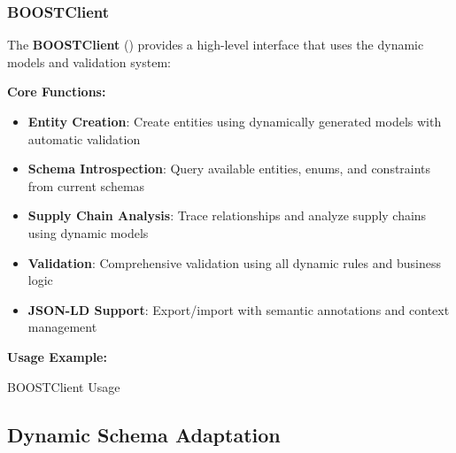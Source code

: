 \subsubsection{BOOSTClient}
\label{sec:python-client}

The \textbf{BOOSTClient} () provides a high-level interface that uses the dynamic models and validation system:

\textbf{Core Functions:}
\begin{itemize}
    \item \textbf{Entity Creation}: Create entities using dynamically generated models with automatic validation
    \item \textbf{Schema Introspection}: Query available entities, enums, and constraints from current schemas
    \item \textbf{Supply Chain Analysis}: Trace relationships and analyze supply chains using dynamic models
    \item \textbf{Validation}: Comprehensive validation using all dynamic rules and business logic
    \item \textbf{JSON-LD Support}: Export/import with semantic annotations and context management
\end{itemize}

\textbf{Usage Example:}

\begin{pythonexample}{BOOSTClient Usage}
\end{pythonexample}

\subsection{Dynamic Schema Adaptation}
\label{sec:python-schema-adaptation}

